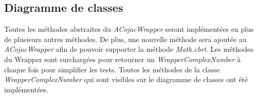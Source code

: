 \subsection{Diagramme de classes}

Toutes les méthodes abstraites du \textit{ACojacWrapper} seront implémentées en plus de plusieurs autres méthodes. De plus, une nouvelle méthode sera ajoutée au \textit{ACojacWrapper} afin de pouvoir supporter la méthode \textit{Math.cbrt}. Les méthodes du \gls{Wrapper} sont surchargées pour retourner un \textit{WrapperComplexNumber} à chaque fois pour simplifier les tests. Toutes les méthodes de la classe \textit{WrapperComplexNumber} qui sont visibles sur le diagramme de classes ont été implémentées.

\begin{minipage}{\linewidth}
\label{fig:class_diagram}
\end{minipage}